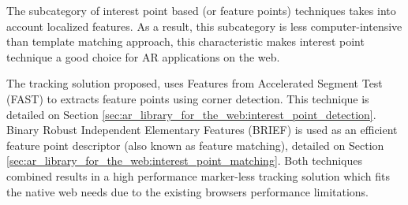The subcategory of interest point based (or feature points) techniques takes into account localized features. As a result, this subcategory is less computer-intensive than template matching approach, this characteristic makes interest point technique a good choice for AR applications on the web.

The tracking solution proposed, uses Features from Accelerated Segment Test (FAST) \cite{Rosten2010} to extracts feature points using corner detection. This technique is detailed on Section \ref{sec:ar_library_for_the_web:interest_point_detection}. Binary Robust Independent Elementary Features (BRIEF) \cite{Calonder2010} is used as an efficient feature point descriptor (also known as feature matching), detailed on Section \ref{sec:ar_library_for_the_web:interest_point_matching}. Both techniques combined results in a high performance marker-less tracking solution which fits the native web needs due to the existing browsers performance limitations.



